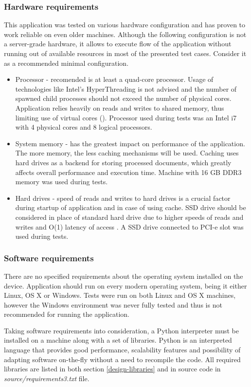 \subsubsection{Hardware requirements}
This application was tested on various hardware configuration and has proven to work reliable on even older machines. Although the following configuration is not a server-grade hardware, it allows to execute flow of the application without running out of available resources in most of the presented test cases. Consider it as a recommended minimal configuration.
\begin{itemize}
	\item Processor - recomended is at least a quad-core processor. Usage of technologies like Intel's HyperThreading is not advised and the number of spawned child processes should not exceed the number of physical cores. Application relies heavily on reads and writes to shared memory, thus limiting use of virtual cores (\cite{performance_ht}). Processor used during tests was an Intel i7 with 4 physical cores and 8 logical processors.
	\item System memory - has the greatest impact on performance of the application. The more memory, the less caching mechanisms will be used. Caching uses hard drives as a backend for storing processed documents, which greatly affects overall performance and execution time. Machine with 16 GB DDR3 memory was used during tests.
	\item Hard drives - speed of reads and writes to hard drives is a crucial factor during startup of application and in case of using cache. SSD drive should be considered in place of standard hard drive due to higher speeds of reads and writes and O(1) latency of access \cite{performance_hdd_ssd}. A SSD drive connected to PCI-e slot was used during tests.
\end{itemize}


\subsubsection{Software requirements}
There are no specified requirements about the operating system installed on the device. Application should run on every modern operating system, being it either Linux, OS X or Windows. Tests were run on both Linux and OS X machines, however the Windows environment was never fully tested and thus is not recommended for running the application.

Taking software requirements into consideration, a Python interpreter must be installed on a machine along with a set of libraries. Python is an interpreted language that provides good performance, scalability features and possibility of adapting software on-the-fly without a need to recompile the code. All required libraries are listed in both section \ref{design-libraries} and in source code in \textit{source/requirements3.txt} file.
 
